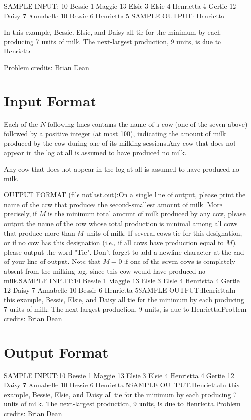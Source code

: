\documentclass[12pt]{article}
\begin{document}
SAMPLE INPUT:
10
Bessie 1
Maggie 13
Elsie 3
Elsie 4
Henrietta 4
Gertie 12
Daisy 7
Annabelle 10
Bessie 6
Henrietta 5
SAMPLE OUTPUT: 
Henrietta

In this example, Bessie, Elsie, and Daisy all tie for the minimum by each
producing 7 units of milk.  The next-largest production, 9 units, is due to
Henrietta.


Problem credits: Brian Dean



\section*{Input Format}
Each of the $N$ following lines contains the name of a cow (one of the seven
above) followed by a positive integer (at most 100), indicating the amount of
milk produced by the cow during one of its milking sessions.Any cow that does not appear in the log at all is assumed to have produced no
milk.

Any cow that does not appear in the log at all is assumed to have produced no
milk.

OUTPUT FORMAT (file notlast.out):On a single line of output, please print the name of the cow that produces the 
second-smallest amount of milk.  More precisely, if $M$ is the minimum total
amount of milk produced by any cow, please output the name of the cow whose
total production is minimal among all cows that produce more than $M$ units of
milk.  If several cows tie for this designation, or if no cow has this
designation (i.e., if all cows have production equal to $M$), please output the
word "Tie". Don't forget to add a newline character at the end of your line of
output. Note that $M=0$ if one of the seven cows is completely absent from the
milking log, since this cow would have produced no milk.SAMPLE INPUT:10
Bessie 1
Maggie 13
Elsie 3
Elsie 4
Henrietta 4
Gertie 12
Daisy 7
Annabelle 10
Bessie 6
Henrietta 5SAMPLE OUTPUT:HenriettaIn this example, Bessie, Elsie, and Daisy all tie for the minimum by each
producing 7 units of milk.  The next-largest production, 9 units, is due to
Henrietta.Problem credits: Brian Dean

\section*{Output Format}
SAMPLE INPUT:10
Bessie 1
Maggie 13
Elsie 3
Elsie 4
Henrietta 4
Gertie 12
Daisy 7
Annabelle 10
Bessie 6
Henrietta 5SAMPLE OUTPUT:HenriettaIn this example, Bessie, Elsie, and Daisy all tie for the minimum by each
producing 7 units of milk.  The next-largest production, 9 units, is due to
Henrietta.Problem credits: Brian Dean
\end{document}
